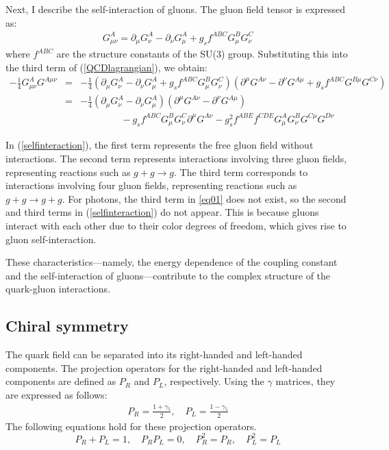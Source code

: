         Next, I describe the self-interaction of gluons. The gluon field tensor is expressed as:
        \begin{eqnarray}
        \label{eq01}
            G^A_{\mu\nu} = \partial_\mu G^A_\nu - \partial_\nu G^A_\mu + g_s f^{ABC}G^B_\mu G^C_\nu
        \end{eqnarray}  
        where $f^{ABC}$ are the structure constants of the SU(3) group. Substituting this into the third term of (\ref{QCDlagrangian}), we obtain:  
        \begin{eqnarray}
            \nonumber
            -\frac{1}{4}G^A_{\mu\nu} G^{A\mu\nu} &=& -\frac{1}{4}(\partial_\mu G^A_\nu - \partial_\nu G^A_\mu + g_s f^{ABC} G^B_\mu G^C_\nu)(\partial^\mu G^{A\nu} - \partial^{\nu} G^{A\mu} + g_s f^{ABC} G^{B\mu} G^{C\nu})\\ 
            \nonumber
            &=& -\frac{1}{4}(\partial_\mu G^A_\nu - \partial_\nu G^A_\mu)(\partial^\mu G^{A\nu} - \partial^{\nu} G^{A\mu}) \\
            \label{selfinteraction}
            && \qquad\qquad\ - g_s f^{ABC}G^B_\mu G^C_\nu \partial^\mu G^{A\nu} - g_s^2 f^{ABE}f^{CDE}G^A_\mu G^B_\nu G^{C\mu}G^{D\nu}
        \end{eqnarray}  
        
        In (\ref{selfinteraction}), the first term represents the free gluon field without interactions. The second term represents interactions involving three gluon fields, representing reactions such as $g+g \rightarrow g$. The third term corresponds to interactions involving four gluon fields, representing reactions such as $g+g \rightarrow g+g$. For photons, the third term in \eqref{eq01} does not exist, so the second and third terms in (\ref{selfinteraction}) do not appear. This is because gluons interact with each other due to their color degrees of freedom, which gives rise to gluon self-interaction.  
        
        These characteristics—namely, the energy dependence of the coupling constant and the self-interaction of gluons—contribute to the complex structure of the quark-gluon interactions.
    \subsection{Chiral symmetry}
    \label{Intro:Chiral_symmetry}  
        The quark field can be separated into its right-handed and left-handed components. The projection operators for the right-handed and left-handed components are defined as $P_R$ and $P_L$, respectively. Using the $\gamma$ matrices, they are expressed as follows:  
        \begin{eqnarray}
            P_R = \frac{1+\gamma_5}{2}, \quad P_L = \frac{1-\gamma_5}{2} 
        \end{eqnarray}
        The following equations hold for these projection operators.
        \begin{equation}
            P_R + P_L = 1, \quad P_R P_L = 0, \quad P_R^2 = P_R, \quad P_L^2 = P_L  
        \end{equation}
        
